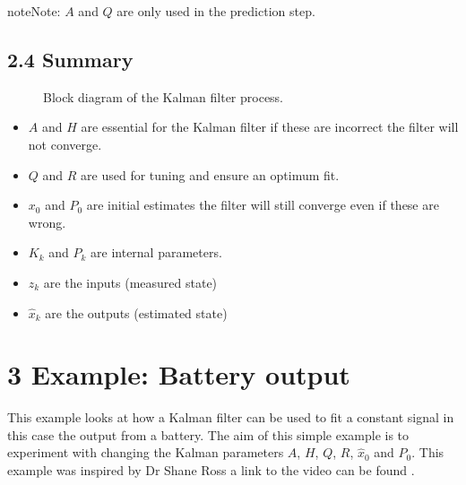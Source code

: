 \documentclass[letterpaper,10pt,english]{jupyterBook}
\begin{document}
\begin{sphinxadmonition}{note}{Note:}
\sphinxAtStartPar
\(A\) and \(Q\) are only used in the prediction step.
\end{sphinxadmonition}


\section{2.4 Summary}
\label{\detokenize{2KalmanFilters:summary}}
\begin{figure}[htbp]
\centering
\capstart

\noindent{}
\caption{Block diagram of the Kalman filter process.}\label{\detokenize{2KalmanFilters:fig-kalman-block-diagram}}\end{figure}
\begin{itemize}
\item {} 
\sphinxAtStartPar
\(A\) and \(H\) are essential for the Kalman filter if these are incorrect the filter will not converge.

\item {} 
\sphinxAtStartPar
\(Q\) and \(R\) are used for tuning and ensure an optimum fit.

\item {} 
\sphinxAtStartPar
\(x_0\) and \(P_0\) are initial estimates the filter will still converge even if these are wrong.

\item {} 
\sphinxAtStartPar
\(K_k\) and \(P_k\) are internal parameters.

\item {} 
\sphinxAtStartPar
\(z_k\) are the inputs (measured state)

\item {} 
\sphinxAtStartPar
\(\hat{x}_k\) are the outputs (estimated state)

\end{itemize}

\sphinxstepscope


\chapter{3 Example: Battery output}
\label{\detokenize{3ExampleBatteryOutput:example-battery-output}}\label{\detokenize{3ExampleBatteryOutput::doc}}
\sphinxAtStartPar
This example looks at how a Kalman filter can be used to fit a constant signal in this case the output from a battery. The aim of this simple example is to experiment with changing the Kalman parameters \(A\), \(H\), \(Q\), \(R\), \(\hat{x}_0\) and \(P_0\). This example was inspired by Dr Shane Ross a link to the video can be found .
\end{document}
